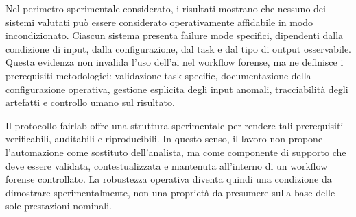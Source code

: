 Nel perimetro sperimentale considerato, i risultati mostrano che nessuno dei
sistemi valutati può essere considerato operativamente affidabile in modo
incondizionato. Ciascun sistema presenta
failure mode specifici, dipendenti dalla condizione di input, dalla
configurazione, dal task e dal tipo di output osservabile. Questa evidenza non
invalida l'uso dell'\gls{ai} nel workflow forense, ma ne definisce i prerequisiti
metodologici: validazione task-specific, documentazione della configurazione
operativa, gestione esplicita degli input anomali, tracciabilità degli artefatti
e controllo umano sul risultato.

Il protocollo \gls{fairlab} offre una struttura sperimentale per rendere tali
prerequisiti verificabili, auditabili e riproducibili. In questo senso, il lavoro
non propone l'automazione come sostituto dell'analista, ma come componente di
supporto che deve essere validata, contestualizzata e mantenuta all'interno di un
workflow forense controllato. La robustezza operativa diventa quindi una
condizione da dimostrare sperimentalmente, non una proprietà da presumere sulla
base delle sole prestazioni nominali.

